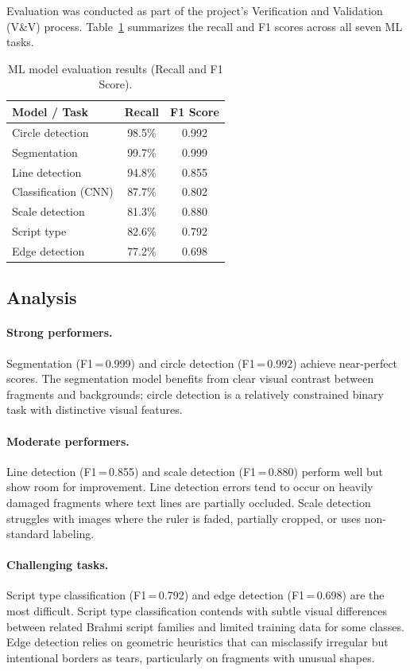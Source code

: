 \documentclass[11pt]{article}
\begin{document}
Evaluation was conducted as part of the project's Verification and Validation (V\&V) process.
Table~\ref{tab:ml-metrics} summarizes the recall and F1 scores across all seven ML tasks.

\begin{table}[t]
\centering
\begin{tabular}{lcc}
\toprule
\textbf{Model / Task} & \textbf{Recall} & \textbf{F1 Score} \\
\midrule
Circle detection     & 98.5\%  & 0.992 \\
Segmentation         & 99.7\%  & 0.999 \\
Line detection       & 94.8\%  & 0.855 \\
Classification (CNN) & 87.7\%  & 0.802 \\
Scale detection      & 81.3\%  & 0.880 \\
Script type          & 82.6\%  & 0.792 \\
Edge detection       & 77.2\%  & 0.698 \\
\bottomrule
\end{tabular}
\caption{ML model evaluation results (Recall and F1 Score).}
\label{tab:ml-metrics}
\end{table}

\subsection{Analysis}

\paragraph{Strong performers.}
Segmentation (F1\,=\,0.999) and circle detection (F1\,=\,0.992) achieve near-perfect scores.
The segmentation model benefits from clear visual contrast between fragments and backgrounds; circle detection is a relatively constrained binary task with distinctive visual features.

\paragraph{Moderate performers.}
Line detection (F1\,=\,0.855) and scale detection (F1\,=\,0.880) perform well but show room for improvement.
Line detection errors tend to occur on heavily damaged fragments where text lines are partially occluded.
Scale detection struggles with images where the ruler is faded, partially cropped, or uses non-standard labeling.

\paragraph{Challenging tasks.}
Script type classification (F1\,=\,0.792) and edge detection (F1\,=\,0.698) are the most difficult.
Script type classification contends with subtle visual differences between related Brahmi script families and limited training data for some classes.
Edge detection relies on geometric heuristics that can misclassify irregular but intentional borders as tears, particularly on fragments with unusual shapes.
\end{document}
